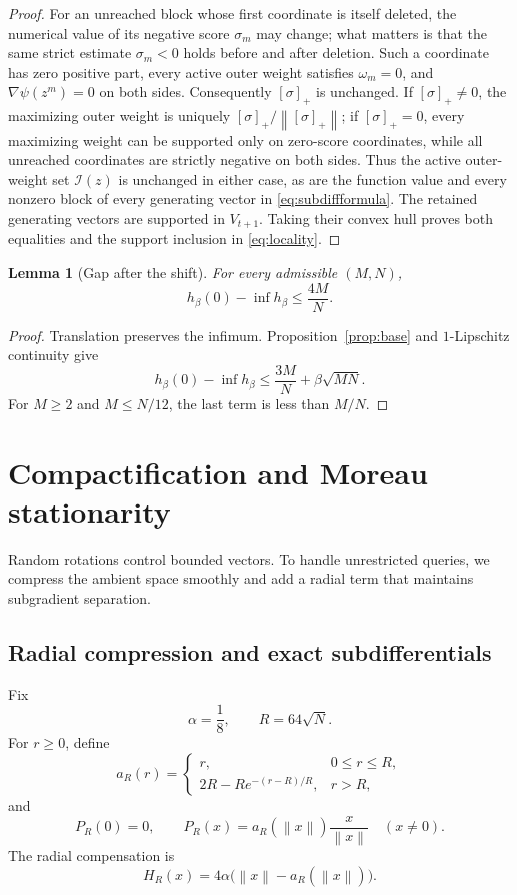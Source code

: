 \documentclass[11pt,a4paper]{article}
\newcommand{\norm}[1]{\left\lVert #1\right\rVert}
\newcommand{\cI}{\mathcal I}
\newtheorem{lemma}[theorem]{Lemma}
\theoremstyle{definition}
\numberwithin{equation}{section}
\begin{document}
\begin{proof}
For an unreached block whose first coordinate is itself deleted, the numerical value of its negative score $\sigma_m$ may change; what matters is that the same strict estimate $\sigma_m<0$ holds before and after deletion.  Such a coordinate has zero positive part, every active outer weight satisfies $\omega_m=0$, and $\nabla\psi(z^m)=0$ on both sides.  Consequently $[\sigma]_+$ is unchanged.  If $[\sigma]_+\neq0$, the maximizing outer weight is uniquely $[\sigma]_+/\norm{[\sigma]_+}$; if $[\sigma]_+=0$, every maximizing weight can be supported only on zero-score coordinates, while all unreached coordinates are strictly negative on both sides.  Thus the active outer-weight set $\cI(z)$ is unchanged in either case, as are the function value and every nonzero block of every generating vector in \eqref{eq:subdiffformula}.  The retained generating vectors are supported in $V_{t+1}$.  Taking their convex hull proves both equalities and the support inclusion in \eqref{eq:locality}.
\end{proof}

\begin{lemma}[Gap after the shift]\label{lem:shiftgap}
For every admissible $(M,N)$,
\[
 h_\beta(0)-\inf h_\beta\le\frac{4M}{N}.
\]
\end{lemma}

\begin{proof}
Translation preserves the infimum.  Proposition~\ref{prop:base} and $1$-Lipschitz continuity give
\[
 h_\beta(0)-\inf h_\beta
 \le\frac{3M}{N}+\beta\sqrt{MN}.
\]
For $M\ge2$ and $M\le N/12$, the last term is less than $M/N$.
\end{proof}

\section{Compactification and Moreau stationarity}\label{sec:compression}

Random rotations control bounded vectors. To handle unrestricted queries,
we compress the ambient space smoothly and add a radial term that maintains
subgradient separation.

\subsection{Radial compression and exact subdifferentials}

Fix
\[
 \alpha=\frac18,
 \qquad
 R=64\sqrt N.
\]
For $r\ge0$, define
\[
 a_R(r)=
 \begin{cases}
 r,&0\le r\le R,\\
 2R-Re^{-(r-R)/R},&r>R,
 \end{cases}
\]
and
\[
 P_R(0)=0,
 \qquad
 P_R(x)=a_R(\norm x)\frac{x}{\norm x}\quad(x\ne0).
\]
The radial compensation is
\begin{equation}\label{eq:Hdef}
 H_R(x)=4\alpha\bigl(\norm x-a_R(\norm x)\bigr).
\end{equation}
\end{document}
